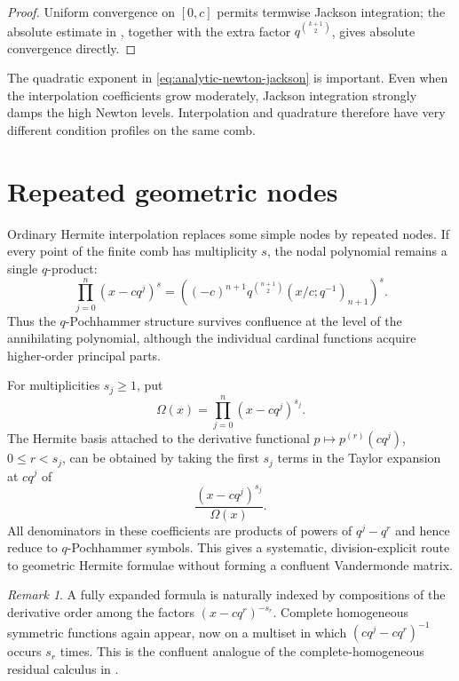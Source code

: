 \documentclass[11pt,oneside]{book}
\numberwithin{equation}{chapter}
\theoremstyle{definition}
\theoremstyle{remark}
\newtheorem{remark}[theorem]{Remark}
\begin{document}
\begin{proof}
Uniform convergence on $[0,c]$ permits termwise Jackson integration; the
absolute estimate in , together with
the extra factor $q^{\binom{k+1}{2}}$, gives absolute convergence directly.
\end{proof}

The quadratic exponent in \eqref{eq:analytic-newton-jackson} is important.
Even when the interpolation coefficients grow moderately, Jackson
integration strongly damps the high Newton levels.  Interpolation and
quadrature therefore have very different condition profiles on the same
comb.

\section{Repeated geometric nodes}

Ordinary Hermite interpolation replaces some simple nodes by repeated
nodes.  If every point of the finite comb has multiplicity $s$, the nodal
polynomial remains a single $q$-product:
\begin{equation}
 \prod_{j=0}^{n}(x-cq^j)^s
 =\left((-c)^{n+1}q^{\binom{n+1}{2}}
        (x/c;q^{-1})_{n+1}\right)^s.
 \label{eq:uniform-confluent-q-product}
\end{equation}
Thus the $q$-Pochhammer structure survives confluence at the level of the
annihilating polynomial, although the individual cardinal functions acquire
higher-order principal parts.

For multiplicities $s_j\ge1$, put
\[
 \Omega(x)=\prod_{j=0}^{n}(x-cq^j)^{s_j}.
\]
The Hermite basis attached to the derivative functional
$p\mapsto p^{(r)}(cq^j)$, $0\le r<s_j$, can be obtained by taking the first
$s_j$ terms in the Taylor expansion at $cq^j$ of
\begin{equation}
 \frac{(x-cq^j)^{s_j}}{\Omega(x)}.
 \label{eq:confluent-reciprocal-germ}
\end{equation}
All denominators in these coefficients are products of powers of
$q^j-q^r$ and hence reduce to $q$-Pochhammer symbols.  This gives a
systematic, division-explicit route to geometric Hermite formulae without
forming a confluent Vandermonde matrix.

\begin{remark}
A fully expanded formula is naturally indexed by compositions of the
derivative order among the factors $(x-cq^r)^{-s_r}$.  Complete homogeneous
symmetric functions again appear, now on a multiset in which
$(cq^j-cq^r)^{-1}$ occurs $s_r$ times.  This is the confluent analogue of the
complete-homogeneous residual calculus in .
\end{remark}
\end{document}
